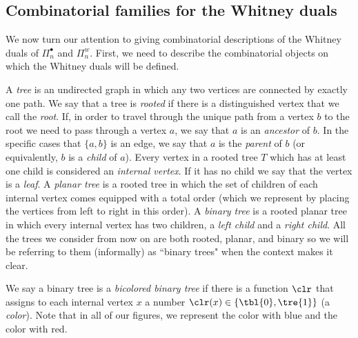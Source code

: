 \subsection{Combinatorial families for the Whitney duals} \label{section:combinatorial_families}
We now turn our attention to giving combinatorial descriptions of the Whitney duals of $\Pi_n^\bullet$ and $\Pi_n^w$. First, we need to describe the combinatorial objects on which the Whitney duals will be defined. 

A \emph{tree} is an undirected graph in which any two vertices are connected by exactly one path. We say that a tree is \emph{rooted} if there is a distinguished vertex that we call the \emph{root}.  If, in order to travel through the unique path from a vertex $b$ to the root we need to pass through a vertex $a$, we say that $a$ is an \emph{ancestor} of $b$. In the specific cases that $\{a,b\}$ is an edge, we say that $a$ is the \emph{parent} of $b$ (or equivalently, $b$ is a \emph{child} of $a$). Every vertex in a rooted tree $T$ which has at least one child is considered an \emph{internal vertex}. If it has no child we say that the vertex is a \emph{leaf}. A \emph{planar tree} is a rooted tree in which the set of children of each internal vertex comes equipped with a total order (which we represent by placing the vertices from left to right in this order). A \emph{binary tree} is a rooted planar tree in which every internal vertex has two children, a \emph{left child} and a \emph{right child}.  All the trees we consider from now on are both rooted, planar, and binary so we will be referring to them (informally) as ``binary trees" when the context makes it clear.

We say a binary tree is a \emph{bicolored binary tree} if there is a function $\clr$ that assigns to each internal vertex $x$ a number $\clr(x)\in \{\tbl{0},\tre{1}\}$ (a \emph{color}).  Note that in all of our figures, we represent the color  with blue and the color  with red. 

